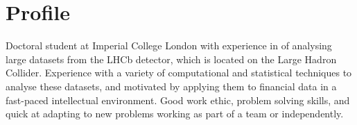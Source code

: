 
\section{Profile}
\cvline{}{}
{
  Doctoral student at Imperial College London with experience in of analysing large datasets
  from the LHCb detector, which is located on the Large Hadron Collider.
  Experience with a variety of computational and statistical techniques to analyse these datasets,
  and motivated by applying them to financial data in a fast-paced intellectual environment.
  Good work ethic, problem solving skills, and quick at adapting to new problems working as part of
  a team or independently.
}
















